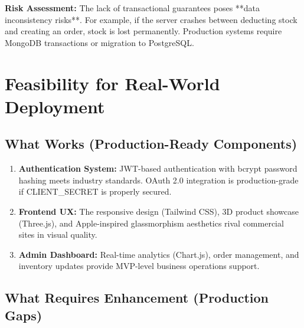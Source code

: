 \documentclass[12pt, a4paper]{report}
\begin{document}
\textbf{Risk Assessment:} The lack of transactional guarantees poses **data inconsistency risks**. For example, if the server crashes between deducting stock and creating an order, stock is lost permanently. Production systems require MongoDB transactions or migration to PostgreSQL.

\section{Feasibility for Real-World Deployment}

\subsection{What Works (Production-Ready Components)}

\begin{enumerate}
    \item \textbf{Authentication System:} JWT-based authentication with bcrypt password hashing meets industry standards. OAuth 2.0 integration is production-grade if CLIENT\_SECRET is properly secured.
    
    \item \textbf{Frontend UX:} The responsive design (Tailwind CSS), 3D product showcase (Three.js), and Apple-inspired glassmorphism aesthetics rival commercial sites in visual quality.
    
    \item \textbf{Admin Dashboard:} Real-time analytics (Chart.js), order management, and inventory updates provide MVP-level business operations support.
\end{enumerate}

\subsection{What Requires Enhancement (Production Gaps)}
\end{document}
